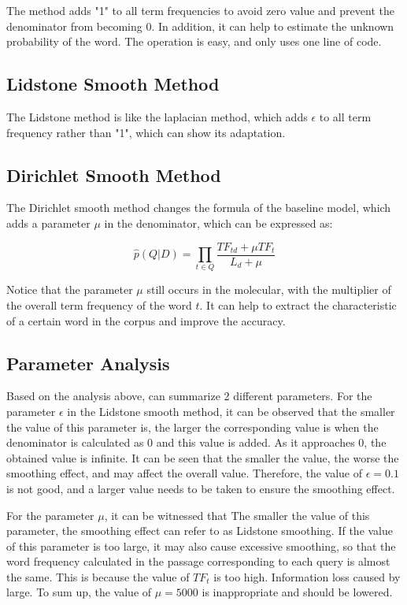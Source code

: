 \documentclass[11pt]{article}
\begin{document}
The method adds "1" to all term frequencies to avoid zero value and prevent the denominator from becoming 0. In addition, it can help to estimate the unknown probability of the word. The operation is easy, and only uses one line of code.

\subsection{Lidstone Smooth Method}

The Lidstone method is like the laplacian method, which adds $\epsilon$ to all term frequency rather than "1", which can show its adaptation.

\subsection{Dirichlet Smooth Method}

The Dirichlet smooth method changes the formula of the baseline model, which adds a parameter $\mu$ in the denominator, which can be expressed as:

\begin{equation}
\hat{p}(Q | D) = \prod_{t\in Q} \frac{TF_{td} + \mu TF_{t}}{L_d + \mu}
\end{equation}

Notice that the parameter $\mu$ still occurs in the molecular, with the multiplier of the overall term frequency of the word $t$. It can help to extract the characteristic of a certain word in the corpus and improve the accuracy.

\subsection{Parameter Analysis}

Based on the analysis above, can summarize 2 different parameters. For the parameter $\epsilon$ in the Lidstone smooth method, it can be observed that the smaller the value of this parameter is, the larger the corresponding value is when the denominator is calculated as 0 and this value is added. As it approaches 0, the obtained value is infinite. It can be seen that the smaller the value, the worse the smoothing effect, and may affect the overall value. Therefore, the value of $\epsilon = 0.1$ is not good, and a larger value needs to be taken to ensure the smoothing effect.

For the parameter $\mu$, it can be witnessed that The smaller the value of this parameter, the smoothing effect can refer to as Lidstone smoothing. If the value of this parameter is too large, it may also cause excessive smoothing, so that the word frequency calculated in the passage corresponding to each query is almost the same. This is because the value of $TF_{t}$ is too high. Information loss caused by large. To sum up, the value of $\mu = 5000$ is inappropriate and should be lowered.




\end{document}
